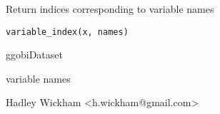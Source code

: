 \begin{Description}\relax
Return indices corresponding to variable names
\end{Description}
\begin{Usage}
\begin{verbatim}variable_index(x, names)\end{verbatim}
\end{Usage}
\begin{Arguments}
\begin{ldescription}
\item[\code{x}] ggobiDataset
\item[\code{names}] variable names
\end{ldescription}
\end{Arguments}
\begin{Details}\relax
\end{Details}
\begin{Author}\relax
Hadley Wickham <h.wickham@gmail.com>
\end{Author}
\begin{Examples}
\begin{ExampleCode}\end{ExampleCode}
\end{Examples}

